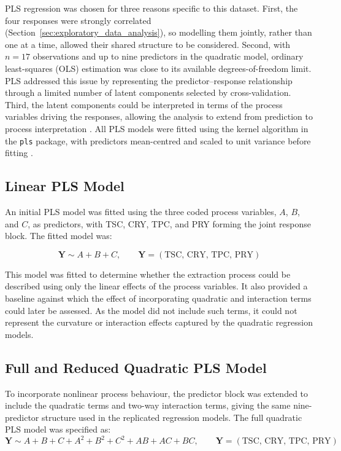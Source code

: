 \documentclass[MScDSA]{uccthesis}
\begin{document}
PLS regression was chosen for three reasons specific to this dataset. First, the four responses were strongly correlated (Section~\ref{sec:exploratory_data_analysis}), so modelling them jointly, rather than one at a time, allowed their shared structure to be considered. Second, with $n=17$ observations and up to nine predictors in the quadratic model, ordinary least-squares (OLS) estimation was close to its available degrees-of-freedom limit. PLS addressed this issue by representing the predictor--response relationship through a limited number of latent components selected by cross-validation. Third, the latent components could be interpreted in terms of the process variables driving the responses, allowing the analysis to extend from prediction to process interpretation \parencite{Wold:2001}. All PLS models were fitted using the kernel algorithm in the \texttt{pls} package, with predictors mean-centred and scaled to unit variance before fitting \parencite{Mevik:2007}.

\subsection{Linear PLS Model}
\label{sec:linear_pls_regression}
An initial PLS model was fitted using the three coded process variables, $A$, $B$, and $C$, as predictors, with TSC, CRY, TPC, and PRY forming the joint response block.
The fitted model was:

\begin{equation}
\mathbf{Y} \sim A + B + C,
\qquad
\mathbf{Y} = \left(\mathrm{TSC},\,
\mathrm{CRY},\,
\mathrm{TPC},\,
\mathrm{PRY}
\right)
\label{eq:linear_pls_regression}
\end{equation}

This model was fitted to determine whether the extraction process could be described using only the linear effects of the process variables. It also provided a baseline against which the effect of incorporating quadratic and interaction terms could later be assessed. As the model did not include such terms, it could not represent the curvature or interaction effects captured by the quadratic regression models.

\subsection{Full and Reduced Quadratic PLS Model}
\label{sec:full_and_reduced_pls_regression}
To incorporate nonlinear process behaviour, the predictor block was extended to include the quadratic terms and two-way interaction terms, giving the same nine-predictor structure used in the replicated regression models.
The full quadratic PLS model was specified as:
\begin{equation}
\mathbf{Y} \sim A + B + C + A^2 + B^2 + C^2 + AB + AC + BC,
\qquad
\mathbf{Y} = \left(\mathrm{TSC},\,
\mathrm{CRY},\,
\mathrm{TPC},\,
\mathrm{PRY}
\right)
\label{eq:full_pls_regression}
\end{equation}
\end{document}
